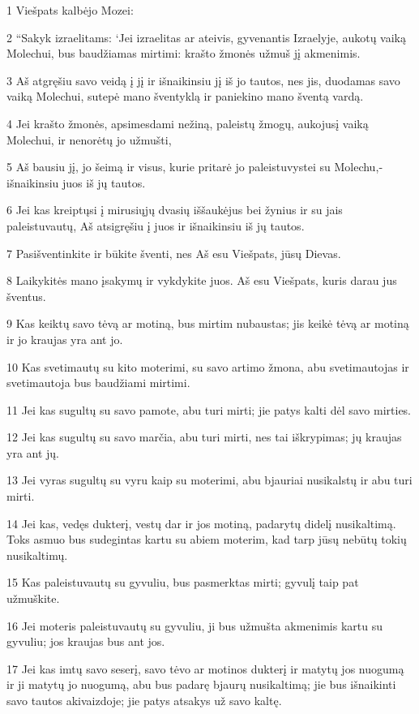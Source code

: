 \par 1 Viešpats kalbėjo Mozei: 
\par 2 “Sakyk izraelitams: ‘Jei izraelitas ar ateivis, gyvenantis Izraelyje, aukotų vaiką Molechui, bus baudžiamas mirtimi: krašto žmonės užmuš jį akmenimis. 
\par 3 Aš atgręšiu savo veidą į jį ir išnaikinsiu jį iš jo tautos, nes jis, duodamas savo vaiką Molechui, sutepė mano šventyklą ir paniekino mano šventą vardą. 
\par 4 Jei krašto žmonės, apsimesdami nežiną, paleistų žmogų, aukojusį vaiką Molechui, ir nenorėtų jo užmušti, 
\par 5 Aš bausiu jį, jo šeimą ir visus, kurie pritarė jo paleistuvystei su Molechu,­išnaikinsiu juos iš jų tautos. 
\par 6 Jei kas kreiptųsi į mirusiųjų dvasių iššaukėjus bei žynius ir su jais paleistuvautų, Aš atsigręšiu į juos ir išnaikinsiu iš jų tautos. 
\par 7 Pasišventinkite ir būkite šventi, nes Aš esu Viešpats, jūsų Dievas. 
\par 8 Laikykitės mano įsakymų ir vykdykite juos. Aš esu Viešpats, kuris darau jus šventus. 
\par 9 Kas keiktų savo tėvą ar motiną, bus mirtim nubaustas; jis keikė tėvą ar motiną ir jo kraujas yra ant jo. 
\par 10 Kas svetimautų su kito moterimi, su savo artimo žmona, abu­ svetimautojas ir svetimautoja­ bus baudžiami mirtimi. 
\par 11 Jei kas sugultų su savo pamote, abu turi mirti; jie patys kalti dėl savo mirties. 
\par 12 Jei kas sugultų su savo marčia, abu turi mirti, nes tai iškrypimas; jų kraujas yra ant jų. 
\par 13 Jei vyras sugultų su vyru kaip su moterimi, abu bjauriai nusikalstų ir abu turi mirti. 
\par 14 Jei kas, vedęs dukterį, vestų dar ir jos motiną, padarytų didelį nusikaltimą. Toks asmuo bus sudegintas kartu su abiem moterim, kad tarp jūsų nebūtų tokių nusikaltimų. 
\par 15 Kas paleistuvautų su gyvuliu, bus pasmerktas mirti; gyvulį taip pat užmuškite. 
\par 16 Jei moteris paleistuvautų su gyvuliu, ji bus užmušta akmenimis kartu su gyvuliu; jos kraujas bus ant jos. 
\par 17 Jei kas imtų savo seserį, savo tėvo ar motinos dukterį ir matytų jos nuogumą ir ji matytų jo nuogumą, abu bus padarę bjaurų nusikaltimą; jie bus išnaikinti savo tautos akivaizdoje; jie patys atsakys už savo kaltę. 
